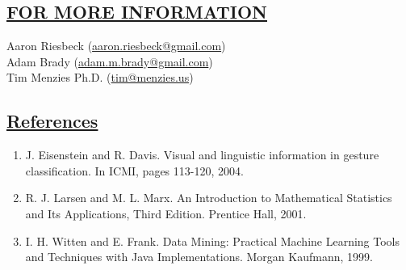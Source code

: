 \begin{kasten}
    \section*{ \hspace{0.1cm} {\color{red} \underline{FOR MORE INFORMATION}}}
    \vspace{-0.5em}
    \normalsize{
      Aaron Riesbeck (\url{aaron.riesbeck@gmail.com})\\
      Adam Brady (\url{adam.m.brady@gmail.com})\\
      Tim Menzies Ph.D. (\url{tim@menzies.us})\\
    }
    \vspace{-0.5em}
\end{kasten}

\begin{kasten}
    \section*{ \hspace{0.1cm} {\color{red} \underline{References}}}
    \vspace{-0.5em}
    \normalsize{
      \begin{enumerate}
      \item J. Eisenstein and R. Davis. Visual and linguistic information in gesture classification. In ICMI, pages 113-120, 2004.
      \item R. J. Larsen and M. L. Marx. An Introduction to Mathematical Statistics and Its Applications, Third Edition. Prentice Hall, 2001.
      \item I. H. Witten and E. Frank. Data Mining: Practical Machine Learning Tools and Techniques with Java Implementations. Morgan Kaufmann, 1999.
      \end{enumerate}
    }
\end{kasten}
